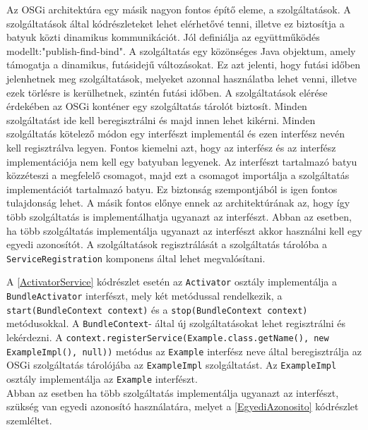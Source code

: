 Az OSGi architektúra egy másik nagyon fontos építő eleme, a szolgáltatások. A szolgáltatások által kódrészleteket lehet elérhetővé tenni, illetve ez biztosítja a batyuk közti dinamikus kommunikációt. Jól definiálja az együttműködés modellt:"publish-find-bind". A szolgáltatás egy közönséges Java objektum, amely támogatja a dinamikus, futásidejű változásokat. Ez azt jelenti, hogy futási időben jelenhetnek meg szolgáltatások, melyeket azonnal használatba lehet venni, illetve ezek törlésre is kerülhetnek, szintén futási időben. A szolgáltatások elérése érdekében az OSGi konténer egy szolgáltatás tárolót biztosít. Minden szolgáltatást ide kell beregisztrálni és majd innen lehet kikérni. Minden szolgáltatás kötelező módon egy interfészt implementál és ezen interfész nevén kell regisztrálva legyen. Fontos kiemelni azt, hogy az interfész és az interfész implementációja nem kell egy batyuban legyenek. Az interfészt tartalmazó batyu közzéteszi a megfelelő csomagot, majd ezt a csomagot importálja a szolgáltatás implementációt tartalmazó batyu. Ez biztonság szempontjából is igen fontos tulajdonság lehet. A másik fontos előnye ennek az architektúrának az, hogy így több szolgáltatás is implementálhatja ugyanazt az interfészt. Abban az esetben, ha több szolgáltatás implementálja ugyanazt az interfészt akkor használni kell egy egyedi azonosítót. A szolgáltatások regisztrálását a szolgáltatás tárolóba a \texttt{ServiceRegistration} komponens által lehet megvalósítani.

%



A \ref{ActivatorService} kódrészlet esetén az \texttt{Activator} osztály implementálja a \texttt{BundleActivator} interfészt, mely két metódussal rendelkezik, a \texttt{start(BundleContext context)} és a \texttt{stop(BundleContext context)} metódusokkal. A \texttt{BundleContext}- által új szolgáltatásokat lehet regisztrálni és lekérdezni. A \texttt{context.registerService(Example.class.getName(), new ExampleImpl(), null))} metódus az \texttt{Example} interfész neve által beregisztrálja az OSGi szolgáltatás tárolójába az \texttt{ExampleImpl} szolgáltatást. Az \texttt{ExampleImpl} osztály implementálja az \texttt{Example} interfészt.
\\Abban az esetben ha több szolgáltatás implementálja ugyanazt az interfészt, szükség van egyedi azonosító használatára, melyet a \ref{EgyediAzonosito} kódrészlet szemléltet.

